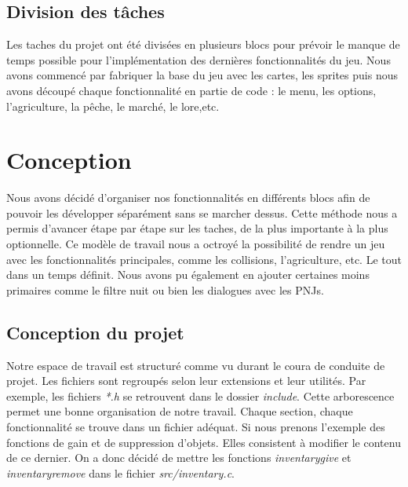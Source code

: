 \documentclass{article}
\begin{document}
\subsection{Division des tâches}

Les taches du projet ont été divisées en plusieurs blocs pour prévoir le manque de temps possible pour l'implémentation des dernières fonctionnalités du jeu. Nous avons commencé par fabriquer la base du jeu avec les cartes, les sprites puis nous avons découpé chaque fonctionnalité en partie de code : le menu, les options, l'agriculture, la pêche, le marché, le lore,etc.




\section{Conception}
Nous avons décidé d'organiser nos fonctionnalités en différents blocs afin de pouvoir les développer séparément sans se marcher dessus. Cette méthode nous a permis d'avancer étape par étape sur les taches, de la plus importante à la plus optionnelle. Ce modèle de travail nous a octroyé la possibilité de rendre un jeu avec les fonctionnalités principales, comme les collisions, l'agriculture, etc. Le tout dans un temps définit. Nous avons pu également en ajouter certaines moins primaires comme le filtre nuit ou bien les dialogues avec les PNJs. 
    
\subsection{Conception du projet}

 Notre espace de travail est structuré comme vu durant le coura de conduite de projet. Les fichiers sont regroupés selon leur extensions et leur utilités. Par exemple, les fichiers \textit{*.h} se retrouvent dans le dossier \textit{include}. Cette arborescence permet une bonne organisation de notre travail. Chaque section, chaque fonctionnalité se trouve dans un fichier adéquat. Si nous prenons l'exemple des fonctions de gain et de suppression d'objets. Elles consistent à modifier le contenu de ce dernier. On a donc décidé de mettre les fonctions \textit{inventary\textunderscore give} et \textit{inventary\textunderscore remove} dans le fichier \textit{src/inventary.c}.
\end{document}
